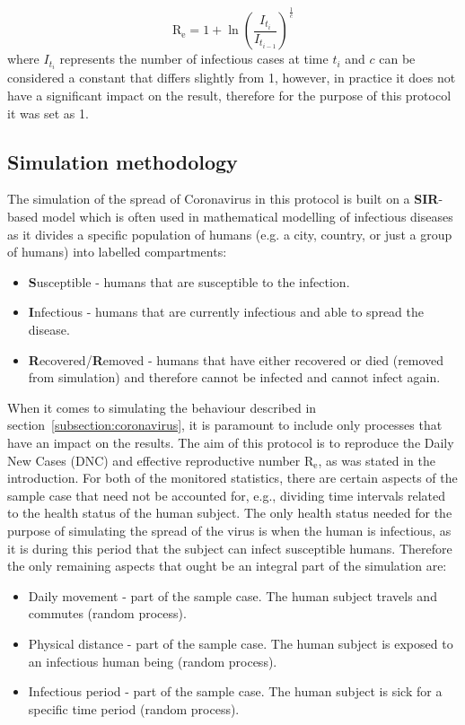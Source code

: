 \documentclass[a4paper]{article}
\begin{document}
\begin{equation}
	\textrm{R}_\textrm{e} = 1 + \ln\left(\frac{I_{t_i}}{I_{t_{i-1}}}\right)^\frac{1}{c}
	\label{equation:effective-reproductive-number}
\end{equation}
\noindent
where $I_{t_i}$ represents the number of infectious cases at time $t_i$ and $c$ can be considered a constant that differs slightly from 1, however, in practice it does not have a significant impact on the result, therefore for the purpose of this protocol it was set as 1.



\subsection{Simulation methodology}\label{subsection:simulation-methodology}
The simulation of the spread of Coronavirus in this protocol is built on a \textbf{SIR}-based model which is often used in mathematical modelling of infectious diseases as it divides a specific population of humans (e.g. a city, country, or just a group of humans) into labelled compartments:
\begin{itemize}
	\item \textbf{S}usceptible - humans that are susceptible to the infection.
	\item \textbf{I}nfectious - humans that are currently infectious and able to spread the disease.
	\item \textbf{R}ecovered/\textbf{R}emoved - humans that have either recovered or died (removed from simulation) and therefore cannot be infected and cannot infect again. 
\end{itemize}

When it comes to simulating the behaviour described in section~\ref{subsection:coronavirus}, it is paramount to include only processes that have an impact on the results. The aim of this protocol is to reproduce the Daily New Cases (DNC) and effective reproductive number $\textrm{R}_\textrm{e}$, as was stated in the introduction. For both of the monitored statistics, there are certain aspects of the sample case that need not be accounted for, e.g., dividing time intervals related to the health status of the human subject. The only health status needed for the purpose of simulating the spread of the virus is when the human is infectious, as it is during this period that the subject can infect susceptible humans. Therefore the only remaining aspects that ought be an integral part of the simulation are:
\begin{itemize}
	\item Daily movement -  part of the sample case. The human subject travels and commutes (random process).
	\item Physical distance -  part of the sample case. The human subject is exposed to an infectious human being (random process).
	\item Infectious period -  part of the sample case. The human subject is sick for a specific time period (random process).
\end{itemize}
\end{document}
